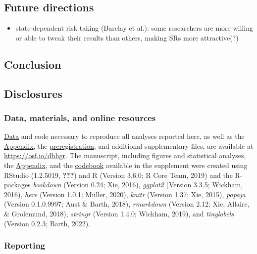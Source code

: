 \documentclass[british,,man,floatsintext]{apa6}
\providecommand{\tightlist}{%
  \setlength{\itemsep}{0pt}\setlength{\parskip}{0pt}}
\begin{document}
\hypertarget{future-directions}{%
\subsection{Future directions}\label{future-directions}}

\begin{itemize}
\tightlist
\item
  state-dependent risk taking (Barclay et al.): some researchers are more willing or able to tweak their results than others, making SRs more attractive(?)
\end{itemize}

\hypertarget{conclusion}{%
\subsection{Conclusion}\label{conclusion}}

\hypertarget{disclosures}{%
\subsection{Disclosures}\label{disclosures}}

\hypertarget{data-materials-and-online-resources}{%
\subsubsection{Data, materials, and online resources}\label{data-materials-and-online-resources}}

\href{https://osf.io/aqr2s/}{Data} and code necessary to reproduce all analyses reported here, as well as the \href{https://osf.io/qw798/}{Appendix}, the \href{https://osf.io/sy927/}{preregistration}, and additional supplementary files, are available at \url{https://osf.io/dbhgr}.
The manuscript, including figures and statistical analyses, the \href{https://osf.io/qw798/}{Appendix}, and the \href{https://osf.io/6jrkz/}{codebook} available in the supplement were created using RStudio (1.2.5019, {\textbf{???}}) and R (Version 3.6.0; R Core Team, 2019) and the R-packages \emph{bookdown} (Version 0.24; Xie, 2016), \emph{ggplot2} (Version 3.3.5; Wickham, 2016), \emph{here} (Version 1.0.1; Müller, 2020), \emph{knitr} (Version 1.37; Xie, 2015), \emph{papaja} (Version 0.1.0.9997; Aust \& Barth, 2018), \emph{rmarkdown} (Version 2.12; Xie, Allaire, \& Grolemund, 2018), \emph{stringr} (Version 1.4.0; Wickham, 2019), and \emph{tinylabels} (Version 0.2.3; Barth, 2022).

\hypertarget{reporting}{%
\subsubsection{Reporting}\label{reporting}}
\end{document}
